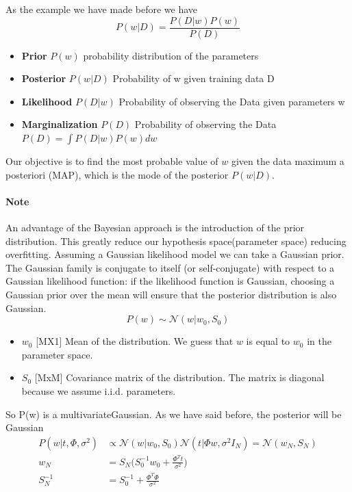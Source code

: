 \documentclass[main.tex]{subfiles}
\begin{document}
As the example we have made before we have
\begin{equation*}
    P(w|D) = \frac{P(D|w)P(w)}{P(D)}
\end{equation*}
\begin{itemize}
    \item \textbf{Prior} $P(w)$ probability distribution of the parameters
    \item \textbf{Posterior} $P(w|D)$ Probability of w given training data D
    \item \textbf{Likelihood} $P(D|w)$ Probability of observing the Data given parameters w
    \item \textbf{Marginalization} $P(D)$ Probability of observing the Data $P(D)=\int P(D|w)P(w)dw$
\end{itemize}
Our objective is to find the most probable value of $w$ given the data maximum a
posteriori (MAP), which is the mode of the posterior $P(w|D)$.

\paragraph{Note} An advantage of the Bayesian approach is the introduction of the prior distribution. This greatly reduce our hypothesis space(parameter space) reducing overfitting.
Assuming a Gaussian likelihood model we can take a Gaussian prior.
The Gaussian family is conjugate to itself (or self-conjugate) with respect to a Gaussian likelihood function: if the likelihood function is Gaussian, choosing a Gaussian prior over the mean will ensure that the posterior distribution is also Gaussian.
\begin{equation}
    P(w) \sim \mathcal{N} (w|w_0, S_0)
\end{equation}
\begin{itemize}
    \item $w_0$ [MX1] Mean of the distribution. We guess that $w$ is equal to $w_0$ in the parameter space.
    \item $S_0$ [MxM] Covariance matrix of the distribution. The matrix is diagonal because we assume i.i.d. parameters.
\end{itemize}
So P(w) is a multivariate\footnotemark Gaussian.
As we have said before, the posterior will be Gaussian
\begin{align*}
    P(w|t, \Phi, \sigma^2) &\propto \mathcal{N} (w|w_0, S_0) \mathcal{N} (t|\Phi w, \sigma^2I_N) = \mathcal{N} (w_N,S_N)\\
    w_N &= S_N \bigg( S_0^{-1}w_0 + \frac{\Phi^T t}{\sigma^2} \bigg) \\
    S_N^{-1} &= S_0^{-1} + \frac{\Phi^T \Phi}{\sigma^2}
\end{align*}
\end{document}
